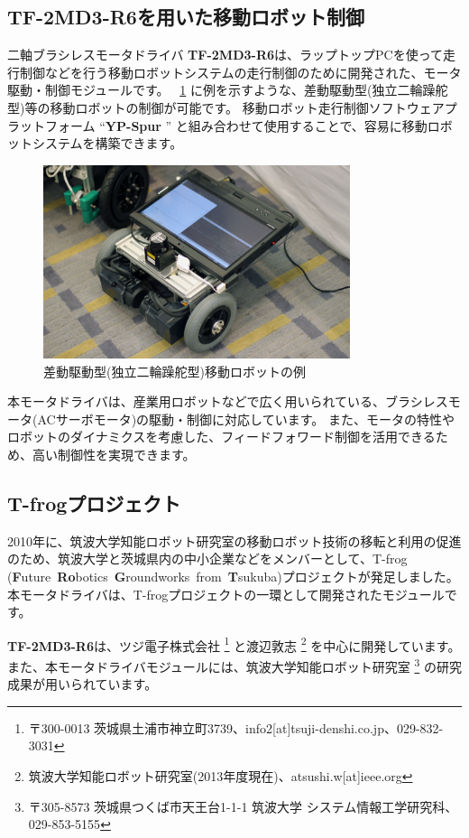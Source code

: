 \documentclass[11pt,a4j,openany]{jbook}
\begin{document}
\subsection{{\bf TF-2MD3-R6}を用いた移動ロボット制御}
二軸ブラシレスモータドライバ {\bf TF-2MD3-R6}は、ラップトップPCを使って走行制御などを行う移動ロボットシステムの走行制御のために開発された、モータ駆動・制御モジュールです。
\figurename~\ref{fig:example_robot} に例を示すような、差動駆動型(独立二輪躁舵型)等の移動ロボットの制御が可能です。
移動ロボット走行制御ソフトウェアプラットフォーム ``{\bf YP-Spur} '' と組み合わせて使用することで、容易に移動ロボットシステムを構築できます。\par
\begin{figure}[H]
\centering\includegraphics[width=90mm]{icart-mini.eps}
\caption{差動駆動型(独立二輪躁舵型)移動ロボットの例}
\label{fig:example_robot}
\end{figure}

 本モータドライバは、産業用ロボットなどで広く用いられている、ブラシレスモータ(ACサーボモータ)の駆動・制御に対応しています。
また、モータの特性やロボットのダイナミクスを考慮した、フィードフォワード制御を活用できるため、高い制御性を実現できます。\par

\subsection{T-frogプロジェクト}
 2010年に、筑波大学知能ロボット研究室の移動ロボット技術の移転と利用の促進のため、筑波大学と茨城県内の中小企業などをメンバーとして、T-frog ({\bf{F}}uture~{\bf{Ro}}botics~{\bf{G}}roundworks~from~{\bf{T}}sukuba)プロジェクトが発足しました。
本モータドライバは、T-frogプロジェクトの一環として開発されたモジュールです。\par

{\bf TF-2MD3-R6}は、ツジ電子株式会社
\footnote{ 〒300-0013 茨城県土浦市神立町3739、info2[at]tsuji-denshi.co.jp、029-832-3031}
と渡辺敦志
\footnote{ 筑波大学知能ロボット研究室(2013年度現在)、atsushi.w[at]ieee.org}
を中心に開発しています。
また、本モータドライバモジュールには、筑波大学知能ロボット研究室
\footnote{ 〒305-8573 茨城県つくば市天王台1-1-1 筑波大学 システム情報工学研究科、029-853-5155}
の研究成果が用いられています。\par
\end{document}
